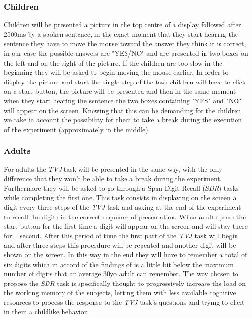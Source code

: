 \documentclass[10pt, a4]{article}
\begin{document}
\subsubsection{Children}
Children will be presented a picture in the top centre of a display followed after 2500ms by a spoken sentence,
in the exact moment that they start hearing the sentence they have to move the mouse toward the answer they think it
is correct, in our case the possible answers are "YES/NO" and are presented in two boxes on the left and on the
right of the picture. If the children are too slow in the beginning they will be asked to begin moving the mouse earlier.
In order to display the picture and start the single step of the task children will have to click on a start button,
the picture will be presented and then in the same moment when they start hearing the sentence the two boxes containing "YES" and "NO"
will appear on the screen.
Knowing that this can be demanding for the children we take in account the possibility for them to take a break during
the execution of the experiment (approximately in the middle).

\subsubsection{Adults}
For adults the \textit{TVJ} task will be presented in the same way, with the only difference that they won't be able to take
a break during the experiment. Furthermore they will be asked to go through a Span Digit Recall (\textit{SDR}) tasks while
completing the first one. This task consists in displaying on the screen a digit every three steps of the \textit{TVJ} task
and asking at the end of the experiment to recall the digits in the correct sequence of presentation. When adults press the start button
for the first time a digit will appear on the screen and will stay there for 1 second. After this period of time the first part of the \textit{TVJ}
task will begin and after three steps this procedure will be repeated and another digit will be shown on the screen.
In this way in the end they will have to remember a total of six digits which in accord of the findings of \cite{taub1972comparison}
is a little bit below the maximum number of digits that an average 30yo adult can remember. The way chosen to propose the \textit{SDR} task is specifically
thought to progressively increase the load on the working memory of the subjects, letting them with less available cognitive resources
to process the response to the \textit{TVJ} task's questions and trying to elicit in them a childlike behavior.
\end{document}
